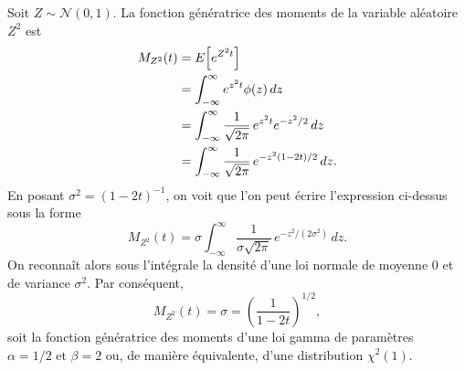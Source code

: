 \begin{solution}{2.9}
    Soit $Z \sim \mathcal{N}(0, 1)$. La fonction génératrice des moments de la
    variable aléatoire $Z^2$ est
    \begin{align*}
      M_{Z^2}(t) &= E\! \left[ e^{Z^2 t} \right] \\
      &= \int_{-\infty}^\infty e^{z^2 t} \phi(z)\, dz \\
      &= \int_{-\infty}^\infty
      \frac{1}{\sqrt{2\pi}}\, e^{z^2 t} e^{-z^2/2}\, dz\\
      &= \int_{-\infty}^\infty
      \frac{1}{\sqrt{2\pi}}\, e^{-z^2 (1 - 2t)/2}\, dz.
    \end{align*}
    En posant $\sigma^2 = (1 - 2t)^{-1}$, on voit que l'on peut écrire
    l'expression ci-dessus sous la forme
    \begin{equation*}
      M_{Z^2}(t) = \sigma \int_{-\infty}^\infty
      \frac{1}{\sigma \sqrt{2\pi}}\, e^{-z^2/(2 \sigma^2)}\,dz.
    \end{equation*}
    On reconnaît alors sous l'intégrale la densité d'une loi normale
    de moyenne $0$ et de variance $\sigma^2$. Par conséquent,
    \begin{equation*}
      M_{Z^2}(t) = \sigma = \left( \frac{1}{1 - 2t}\right)^{1/2},
    \end{equation*}
    soit la fonction génératrice des moments d'une loi gamma de
    paramètres $\alpha = 1/2 \text{ et } \beta = 2$ ou, de manière
    équivalente, d'une distribution $\chi^2(1)$.
  
\end{solution}
